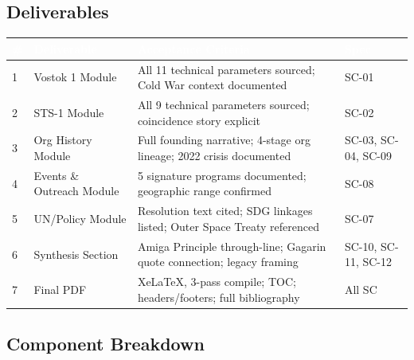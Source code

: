 \documentclass[11pt,letterpaper]{article}
\newcommand{\tableheader}[1]{\textbf{\sffamily\textcolor{white}{#1}}}
\begin{document}
\subsection{Deliverables}

\begin{center}
\begin{tabularx}{\textwidth}{C{0.5cm}L{4cm}XL{2.5cm}}
\toprule
{}
\tableheader{\#} & \tableheader{Deliverable} & \tableheader{Acceptance Criteria} & \tableheader{Spec} \\
 & Vostok 1 Module & All 11 technical parameters sourced; Cold War context documented & SC-01 \\
2 & STS-1 Module & All 9 technical parameters sourced; coincidence story explicit & SC-02 \\
3 & Org History Module & Full founding narrative; 4-stage org lineage; 2022 crisis documented & SC-03, SC-04, SC-09 \\
4 & Events \& Outreach Module & 5 signature programs documented; geographic range confirmed & SC-08 \\
5 & UN/Policy Module & Resolution text cited; SDG linkages listed; Outer Space Treaty referenced & SC-07 \\
6 & Synthesis Section & Amiga Principle through-line; Gagarin quote connection; legacy framing & SC-10, SC-11, SC-12 \\
7 & Final PDF & XeLaTeX, 3-pass compile; TOC; headers/footers; full bibliography & All SC \\
\bottomrule
\end{tabularx}
\end{center}

\subsection{Component Breakdown}
\end{document}
